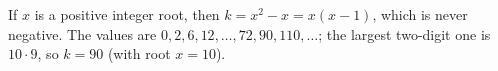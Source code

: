 If $x$ is a positive integer root, then $k=x^2-x=x(x-1)$, which is never negative. The values are $0,2,6,12,\dots,72,90,110,\dots$; the largest two-digit one is $10\cdot9$, so $k=\boxed{90}$ (with root $x=10$).
